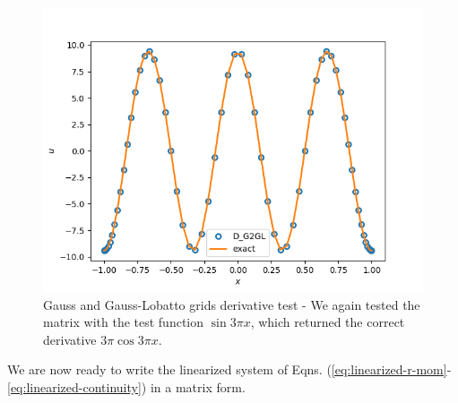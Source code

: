 \documentclass{article}
\newcommand{\bigzero}{\mbox{\normalfont\Large\bfseries 0}}
\newcommand{\rvline}{\hspace*{-\arraycolsep}\vline\hspace*{-\arraycolsep}}
\begin{document}
\begin{figure}[H]
        \centering
    \includegraphics[scale=0.5]{Figs/test_D_g2gl_interpolant.png}
            \caption{Gauss and Gauss-Lobatto grids derivative test - We again tested the matrix with the test function $\sin{3\pi x}$, which returned the correct derivative $3\pi\cos{3\pi x}$.  }
        \label{fig:test_D_g2gl_interpolant}
\end{figure}
We are now ready to write the linearized system of Eqns. (\ref{eq:linearized-r-mom}-\ref{eq:linearized-continuity}) in a matrix form. 
\end{document}
